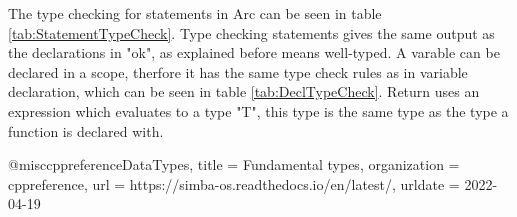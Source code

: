 The type checking for statements in Arc can be seen in table \ref*{tab:StatementTypeCheck}. Type checking statements gives the same output as the declarations in "ok", as explained before means well-typed. A varable can be declared in a scope, therfore it has the same type check rules as in variable declaration, which can be seen in table \ref*{tab:DeclTypeCheck}. Return uses an expression which evaluates to a type "T", this type is the same type as the type a function is declared with. 



@misc{cppreferenceDataTypes,
  title        = {Fundamental types},
  organization = {cppreference},
  url          = {https://simba-os.readthedocs.io/en/latest/},
  urldate      = {2022-04-19}
}